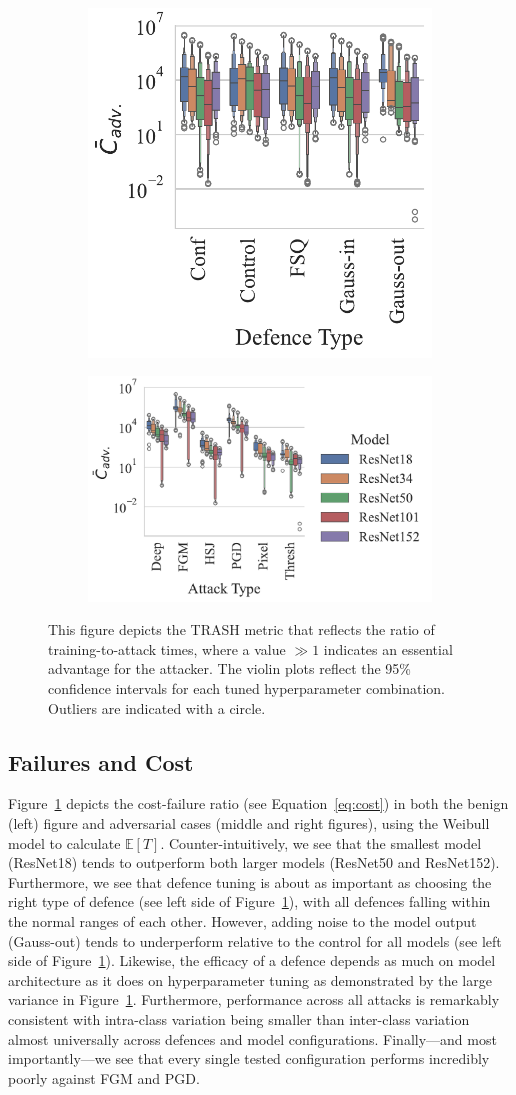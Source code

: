 \begin{figure}
    \centering
    \begin{subfigure}
        \centering
        \includegraphics[width=.28\textwidth]{plots/trash_score_vs_defence_type.pdf}
    \end{subfigure}
    \begin{subfigure}
        \centering
        \includegraphics[width=.45\textwidth]{plots/trash_score_vs_attack_type.pdf}
    \end{subfigure}

    \caption{This figure depicts the TRASH metric that reflects the ratio of training-to-attack times, where a value $\gg 1 $  indicates an essential advantage for the attacker. The violin plots reflect the 95\% confidence intervals for each tuned hyperparameter combination. Outliers are indicated with a circle.}
	\label{fig:trash}
\end{figure}

\subsection{Failures and Cost}

Figure~\ref{fig:trash} depicts the cost-failure ratio (see Equation~\ref{eq:cost}) in both the benign (left) figure and adversarial cases (middle and right figures), using the Weibull model to calculate $\mathbb{E}[T]$. Counter-intuitively, we see that the smallest model (ResNet18) tends to outperform both larger models (ResNet50 and ResNet152).
Furthermore, we see that defence tuning is about as important as choosing the right type of defence (see left side of Figure~\ref{fig:trash}), with all defences falling within the normal ranges of each other.
However, adding noise to the model output (Gauss-out) tends to underperform relative to the control for all models (see left side of Figure~\ref{fig:trash}).
Likewise, the efficacy of a defence depends as much on model architecture as it does on hyperparameter tuning as demonstrated by the large variance in Figure~\ref{fig:trash}.
Furthermore, performance across all attacks is remarkably consistent with intra-class variation being smaller than inter-class variation almost universally across defences and model configurations.
Finally---and most importantly---we see that every single tested configuration performs incredibly poorly against FGM and PGD\@.
